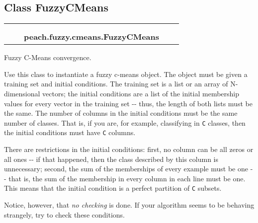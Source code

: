 
\subsection{Class FuzzyCMeans}

    \label{peach:fuzzy:cmeans:FuzzyCMeans}
\begin{tabular}{cccccc}
\multicolumn{2}{r}{\settowidth{\BCL}{object}\multirow{2}{\BCL}{object}}
&&
  \\\cline{3-3}
  &&\multicolumn{1}{c|}{}
&&
  \\
&&\multicolumn{2}{l}{\textbf{peach.fuzzy.cmeans.FuzzyCMeans}}
\end{tabular}


Fuzzy C-Means convergence.

Use this class to instantiate a fuzzy c-means object. The object must be
given a training set and initial conditions. The training set is a list or
an array of N-dimensional vectors; the initial conditions are a list of the
initial membership values for every vector in the training set -{}- thus, the
length of both lists must be the same. The number of columns in the initial
conditions must be the same number of classes. That is, if you are, for
example, classifying in \texttt{C} classes, then the initial conditions must have
\texttt{C} columns.

There are restrictions in the initial conditions: first, no column can be
all zeros or all ones -{}- if that happened, then the class described by this
column is unnecessary; second, the sum of the memberships of every example
must be one -{}- that is, the sum of the membership in every column in each
line must be one. This means that the initial condition is a perfect
partition of \texttt{C} subsets.

Notice, however, that \emph{no checking} is done. If your algorithm seems to be
behaving strangely, try to check these conditions.


